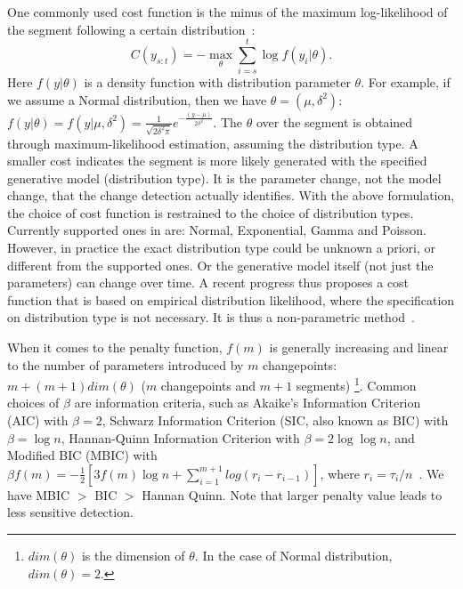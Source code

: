 One commonly used cost function is the minus of the maximum log-likelihood of the segment following a certain distribution~\cite{Killick2011,Horvath1993,Chen2001}:
\begin{equation*}
C(y_{s:t}) = - \max_\theta \sum_{i=s}^t \log f(y_i|\theta).
\end{equation*}
Here $f(y|\theta)$ is a density function with distribution parameter $\theta$. 
For example, if we assume a Normal distribution, then we have $\theta = (\mu, \delta^2)$:
$f(y|\theta) = f(y|\mu, \delta^2) = \frac{1}{\sqrt{2\delta^2\pi}} e^{-\frac{(y-\mu)}{2\delta^2}}$.
The $\theta$ over the segment is obtained through maximum-likelihood estimation, assuming the distribution type.
A smaller cost indicates the segment is more likely generated with the specified generative model (distribution type). 
It is the parameter change, not the model change, that the change detection actually identifies.
With the above formulation, the choice of cost function is restrained to the choice of distribution types.
Currently supported ones in \cite{Killick2013a} are: Normal, Exponential, Gamma and Poisson.
However, in practice the exact distribution type could be unknown a priori, or different from the supported ones.
Or the generative model itself (not just the parameters) can change over time.
A recent progress thus proposes a cost function that is based on empirical distribution likelihood, where the specification on distribution type is not necessary. It is thus a non-parametric method~\cite{Haynes2016}. 

When it comes to the penalty function, $f(m)$ is generally increasing and linear to the number of parameters introduced by $m$ changepoints: 
$m + (m+1)dim(\theta)$ ($m$ changepoints and $m+1$ segments) \footnote{$dim(\theta)$ is the dimension of $\theta$. In the case of Normal distribution, $dim(\theta) = 2$.}.
Common choices of $\beta$ are information criteria, such as Akaike’s Information Criterion (AIC) with $\beta=2$, Schwarz Information Criterion (SIC, also known as BIC) with $\beta=\log n$, Hannan-Quinn Information Criterion with $\beta = 2 \log \log n$, and Modified BIC (MBIC) with 
$\beta f(m) = -\frac{1}{2} [3f(m)\log n + \sum_{i=1}^{m+1} log(r_i - r_{i-1})]$, where $r_i = \tau_i/n$~\cite{Zhang2007}.
We have MBIC $>$ BIC $>$ Hannan Quinn. Note that larger penalty value leads to less sensitive detection.

